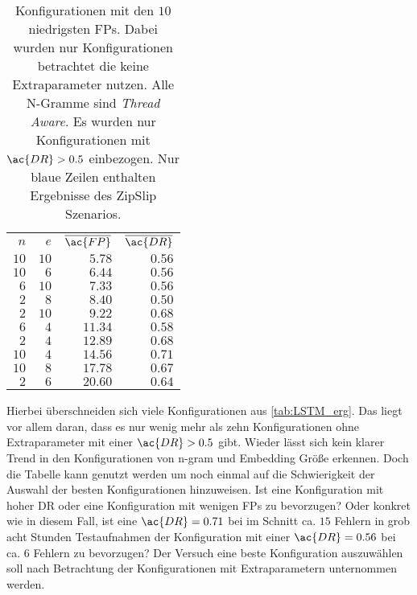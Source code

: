     \begin{table}[ht]
        \centering
        \begin{tabular}{rrrr}
            \hline
            \rowcolor{GruvGray!36}
            \multicolumn{4}{c}{Ohne Extraparameter, nach \ac{FP}}\\
            \toprule
            $n$ & $e$ & $\overline{\ac{FP}}$ & $\overline{\ac{DR}}$ \\
            \midrule
            \rowcolor{GruvGray!16}
            $10$ & 	$10$ & 	$5.78$ & 	    $0.56$ \\
            $10$ & 	$6$ & 	$6.44$ & 	    $0.56$ \\
            \rowcolor{GruvGray!16}
            $6$ & 	$10$ & 	$7.33$ & 	    $0.56$ \\
            \rowcolor{CTblue!16}
            $2$ & 	$8$ & 	$8.40$ & 	    $0.50$ \\
            \rowcolor{GruvGray!16}
            $2$ & 	$10$ & 	$9.22$ & 	    $0.68$ \\
            $6$ & 	$4$ & 	$11.34$ & 	$0.58$ \\
            \rowcolor{GruvGray!16}
            $2$ & 	$4$ & 	$12.89$ & 	$0.68$ \\
            $10$ & 	$4$ & 	$14.56$ & 	$0.71$ \\
            \rowcolor{GruvGray!16}
            $10$ & 	$8$ & 	$17.78$ & 	$0.67$ \\
            \rowcolor{CTblue!16}
            $2$ & 	$6$ & 	$20.60$ & 	$0.64$ \\
            \hline
        \end{tabular}
        \caption[Ergebnisse \ac{FP}-Rate ohne Extraparameter]{Konfigurationen mit den $10$ niedrigsten \acp{FP}. 
                 Dabei wurden nur Konfigurationen betrachtet die keine Extraparameter nutzen.
                 Alle N-Gramme sind \textit{Thread Aware}.
                 Es wurden nur Konfigurationen mit $\ac{DR}>0.5$ einbezogen.
                 Nur blaue Zeilen enthalten Ergebnisse des ZipSlip Szenarios.}
        \label{tab:LSTM_erg_FP}
    \end{table}
    
    Hierbei überschneiden sich viele Konfigurationen aus \autoref{tab:LSTM_erg}.
    Das liegt vor allem daran, dass es nur wenig mehr als zehn Konfigurationen ohne Extraparameter mit einer $\ac{DR}>0.5$ gibt.
    Wieder lässt sich kein klarer Trend in den Konfigurationen von n-gram und Embedding Größe erkennen.
    Doch die Tabelle kann genutzt werden um noch einmal auf die Schwierigkeit der Auswahl der besten Konfigurationen hinzuweisen.
    Ist eine Konfiguration mit hoher \ac{DR} oder eine Konfiguration mit wenigen \acp{FP} zu bevorzugen?
    Oder konkret wie in diesem Fall, ist eine $\ac{DR}=0.71$ bei im Schnitt ca. $15$ Fehlern in grob acht Stunden Testaufnahmen der Konfiguration mit einer $\ac{DR}=0.56$ bei ca. $6$ Fehlern zu bevorzugen?
    Der Versuch eine beste Konfiguration auszuwählen soll nach Betrachtung der Konfigurationen mit Extraparametern unternommen werden.

